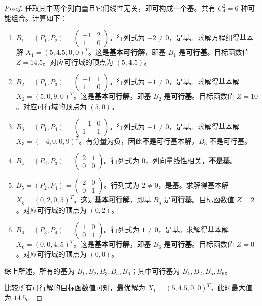 \documentclass[11pt, a4paper]{article}
\begin{document}
\begin{proof}
    任取其中两个列向量且它们线性无关，即可构成一个基。共有 $C_4^2 = 6$ 种可能组合。计算如下：
    \begin{enumerate}
        \item $B_1 = (P_1, P_2) = \begin{pmatrix} -1 & 2 \\ 1 & 0 \end{pmatrix}$。行列式为 $-2 \neq 0$，是基。求解方程组得基本解 $X_1 = (5, 4.5, 0, 0)^T$。这是\textbf{基本可行解}，即基 $B_1$ 是\textbf{可行基}。目标函数值 $Z = 14.5$。对应可行域的顶点为 $(5, 4.5)$。
        \item $B_2 = (P_1, P_3) = \begin{pmatrix} -1 & 1 \\ 1 & 0 \end{pmatrix}$。行列式为 $-1 \neq 0$，是基。求解得基本解 $X_2 = (5, 0, 9, 0)^T$。这是\textbf{基本可行解}，即基 $B_2$ 是\textbf{可行基}。目标函数值 $Z = 10$。对应可行域的顶点为 $(5, 0)$。
        \item $B_3 = (P_1, P_4) = \begin{pmatrix} -1 & 0 \\ 1 & 1 \end{pmatrix}$。行列式为 $-1 \neq 0$，是基。求解得基本解 $X_3 = (-4, 0, 0, 9)^T$。有分量为负，因此\textbf{不是}可行基本解，$B_3$ 不是可行基。
        \item $B_4 = (P_2, P_3) = \begin{pmatrix} 2 & 1 \\ 0 & 0 \end{pmatrix}$。行列式为 $0$，列向量线性相关，\textbf{不是基}。
        \item $B_5 = (P_2, P_4) = \begin{pmatrix} 2 & 0 \\ 0 & 1 \end{pmatrix}$。行列式为 $2 \neq 0$，是基。求解得基本解 $X_5 = (0, 2, 0, 5)^T$。这是\textbf{基本可行解}，即基 $B_5$ 是\textbf{可行基}。目标函数值 $Z = 2$。对应可行域的顶点为 $(0, 2)$。
        \item $B_6 = (P_3, P_4) = \begin{pmatrix} 1 & 0 \\ 0 & 1 \end{pmatrix}$。行列式为 $1 \neq 0$，是基。求解得基本解 $X_6 = (0, 0, 4, 5)^T$。这是\textbf{基本可行解}，即基 $B_6$ 是\textbf{可行基}。目标函数值 $Z = 0$。对应可行域的顶点为 $(0, 0)$。
    \end{enumerate}

    综上所述，所有的基为 $B_1, B_2, B_3, B_5, B_6$；其中可行基为 $B_1, B_2, B_5, B_6$。

    比较所有可行解的目标函数值可知，最优解为 $X_1 = (5, 4.5, 0, 0)^T$，此时最大值为 $14.5$。
\end{proof}
\end{document}
